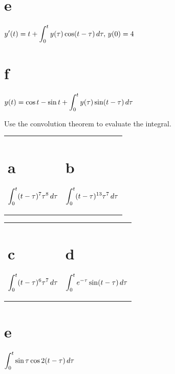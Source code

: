 \begin{exerciselist}
\begin{description}
    \item \part{e} $\displaystyle{y'(t)=t+\int_{0}^{t}y(\tau)\cos (t-\tau)\,d\tau,\,y(0)=4}$

    \item \part{f} $\displaystyle{y(t)=\cos t-\sin t+ \int_{0}^{t}y(\tau)\sin(t-\tau)\,d\tau}$\\[2\jot]
  \end{description}

  \item\label{exer:8.6.5} Use the convolution theorem to evaluate the integral.

  \begin{description}
    \item
      \begin{tabular}[t]{@{}p{168pt}@{}p{168pt}}
        \part{a} $\displaystyle{\int_{0}^{t}(t-\tau)^{7}\tau^{8}\, d\tau}$ & \part{b} $\displaystyle{\int_{0}^{t}(t-\tau)^{13}\tau^{7}\,d\tau}$
      \end{tabular}

    \item
      \begin{tabular}[t]{@{}p{168pt}@{}p{168pt}}
        \part{c} $\displaystyle{\int_{0}^{t}(t-\tau)^{6}\tau^{7}\, d\tau}$ & \part{d} $\displaystyle{\int_{0}^{t}e^{-\tau}\sin(t-\tau)\,d\tau}$
      \end{tabular}

    \item \part{e} $\displaystyle{\int_{0}^{t}\sin\tau\cos2(t-\tau)\,d\tau}$\\[2\jot]
  \end{description}


\end{exerciselist}

